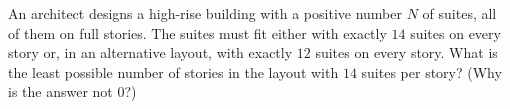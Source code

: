 An architect designs a high-rise building with a positive number $N$ of suites, all of them on full stories. The suites must fit either with exactly $14$ suites on every story or, in an alternative layout, with exactly $12$ suites on every story. What is the least possible number of stories in the layout with $14$ suites per story? (Why is the answer not $0$?)
